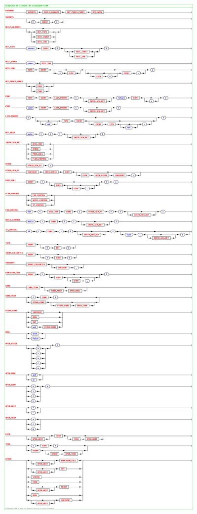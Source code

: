 
\begin{figure}[H]
	\centering 
	\includegraphics[width=\textwidth, clip, trim=0 1635px 0 0]{images/diagrama-sintaxe.png}  
	\label{fig:diagrama-sintaxe-1}
\end{figure}

